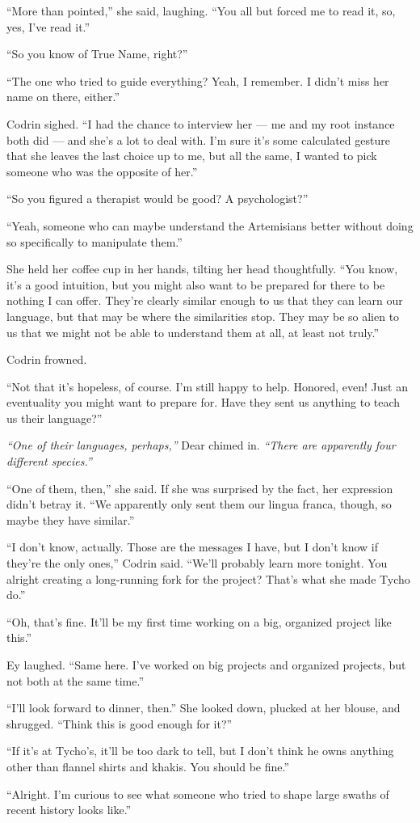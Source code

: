 ``More than pointed,'' she said, laughing. ``You all but forced me to read it, so, yes, I've read it.''

``So you know of True Name, right?''

``The one who tried to guide everything? Yeah, I remember. I didn't miss her name on there, either.''

Codrin sighed. ``I had the chance to interview her — me and my root instance both did — and she's a lot to deal with. I'm sure it's some calculated gesture that she leaves the last choice up to me, but all the same, I wanted to pick someone who was the opposite of her.''

``So you figured a therapist would be good? A psychologist?''

``Yeah, someone who can maybe understand the Artemisians better without doing so specifically to manipulate them.''

She held her coffee cup in her hands, tilting her head thoughtfully. ``You know, it's a good intuition, but you might also want to be prepared for there to be nothing I can offer. They're clearly similar enough to us that they can learn our language, but that may be where the similarities stop. They may be so alien to us that we might not be able to understand them at all, at least not truly.''

Codrin frowned.

``Not that it's hopeless, of course. I'm still happy to help. Honored, even! Just an eventuality you might want to prepare for. Have they sent us anything to teach us their language?''

\emph{``One of their languages, perhaps,''} Dear chimed in. \emph{``There are apparently four different species.''}

``One of them, then,'' she said. If she was surprised by the fact, her expression didn't betray it. ``We apparently only sent them our lingua franca, though, so maybe they have similar.''

``I don't know, actually. Those are the messages I have, but I don't know if they're the only ones,'' Codrin said. ``We'll probably learn more tonight. You alright creating a long-running fork for the project? That's what she made Tycho do.''

``Oh, that's fine. It'll be my first time working on a big, organized project like this.''

Ey laughed. ``Same here. I've worked on big projects and organized projects, but not both at the same time.''

``I'll look forward to dinner, then.'' She looked down, plucked at her blouse, and shrugged. ``Think this is good enough for it?''

``If it's at Tycho's, it'll be too dark to tell, but I don't think he owns anything other than flannel shirts and khakis. You should be fine.''

``Alright. I'm curious to see what someone who tried to shape large swaths of recent history looks like.''
